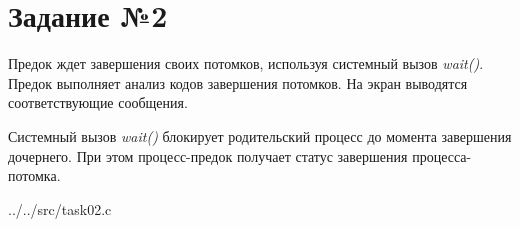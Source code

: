 \section*{Задание №2}

Предок ждет завершения своих потомков, используя системный вызов
\textit{wait()}.  Предок выполняет анализ кодов завершения потомков.  На экран
выводятся соответствующие сообщения.

Системный вызов \textit{wait()} блокирует родительский процесс до момента
завершения дочернего. При этом процесс-предок получает статус завершения
процесса-потомка.

\begin{lstinputlisting}[
	caption={Системный вызов wait()},
	label={lst:wait}
]{../../src/task02.c}
\end{lstinputlisting}

~\\
~\\
~\\
~\\
~\\
~\\
~\\
~\\
